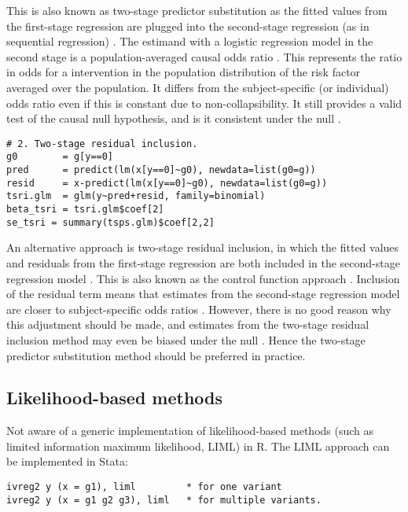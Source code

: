 \documentclass[a4paper,12pt]{article} %
\begin{document}
This is also known as two-stage predictor substitution as the fitted values from the first-stage regression are plugged into the second-stage regression (as in sequential regression) \citep{cai2011}. The estimand with a logistic regression model in the second stage is a population-averaged causal odds ratio . This represents the ratio in odds for a intervention in the population distribution of the risk factor averaged over the population. It differs from the subject-specific (or individual) odds ratio even if this is constant due to non-collapsibility. It still provides a valid test of the causal null hypothesis, and is it consistent under the null \citep{vansteelandt2010}.

\begin{lstlisting}
# 2. Two-stage residual inclusion.
g0        = g[y==0]
pred      = predict(lm(x[y==0]~g0), newdata=list(g0=g))
resid     = x-predict(lm(x[y==0]~g0), newdata=list(g0=g))
tsri.glm  = glm(y~pred+resid, family=binomial)
beta_tsri = tsri.glm$coef[2]
se_tsri = summary(tsps.glm)$coef[2,2]
\end{lstlisting}

An alternative approach is two-stage residual inclusion, in which the fitted values and residuals from the first-stage regression are both included in the second-stage regression model \citep{terza2008}. This is also known as the control function approach \citep{nagelkerke2000}. Inclusion of the residual term means that estimates from the second-stage regression model are closer to subject-specific odds ratios \citep{palmer2008b}. However, there is no good reason why this adjustment should be made, and estimates from the two-stage residual inclusion method may even be biased under the null \citep{vansteelandt2010}. Hence the two-stage predictor substitution method should be preferred in practice.

\clearpage

\subsection{Likelihood-based methods}
Not aware of a generic implementation of likelihood-based methods (such as limited information maximum likelihood, LIML) in R. The LIML approach can be implemented in Stata:
\begin{lstlisting}
ivreg2 y (x = g1), liml         * for one variant
ivreg2 y (x = g1 g2 g3), liml   * for multiple variants.
\end{lstlisting}
\end{document}
